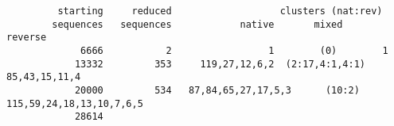 \begin{verbatim}
         starting     reduced                   clusters (nat:rev)
        sequences   sequences            native       mixed       reverse
             6666           2                 1        (0)        1
            13332         353     119,27,12,6,2  (2:17,4:1,4:1)   85,43,15,11,4 
            20000         534   87,84,65,27,17,5,3      (10:2)       115,59,24,18,13,10,7,6,5                   
            28614
\end{verbatim}

